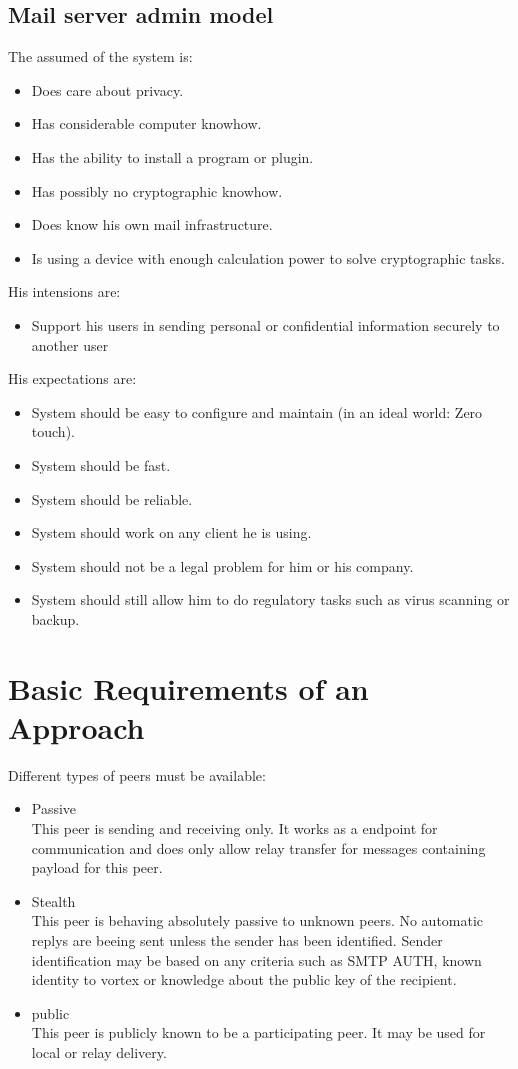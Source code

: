 \subsection{Mail server admin model}
The assumed  of the system is:
\begin{itemize}
\item Does care about privacy.
\item Has considerable computer knowhow.
\item Has the ability to install a program or plugin.
\item Has possibly no cryptographic knowhow.
\item Does know his own mail infrastructure.
\item Is using a device with enough calculation power to solve cryptographic tasks.
\end{itemize}
His intensions are:
\begin{itemize}
\item Support his users in sending personal or confidential information securely to another user
\end{itemize}
His expectations are:
\begin{itemize}
\item System should be easy to configure and maintain (in an ideal world: Zero touch). 
\item System should be fast.
\item System should be reliable.
\item System should work on any client he is using.
\item System should not be a legal problem for him or his company.
\item System should still allow him to do regulatory tasks such as virus scanning or backup.
\end{itemize}

\section{Basic Requirements of an Approach}
Different types of peers must be available:
\begin{itemize}
  \item Passive\\
	This peer is sending and receiving only. It works as a endpoint for communication and does only allow relay transfer for messages containing payload for this peer.
	\item Stealth\\
	This peer is behaving absolutely passive to unknown peers. No automatic replys are beeing sent unless the sender has been identified. Sender identification may be based on any criteria such as SMTP AUTH, known identity to vortex or knowledge about the public key of the recipient.
	\item public\\
	This peer is publicly known to be a participating peer. It may be used for local or relay delivery.
\end{itemize}

